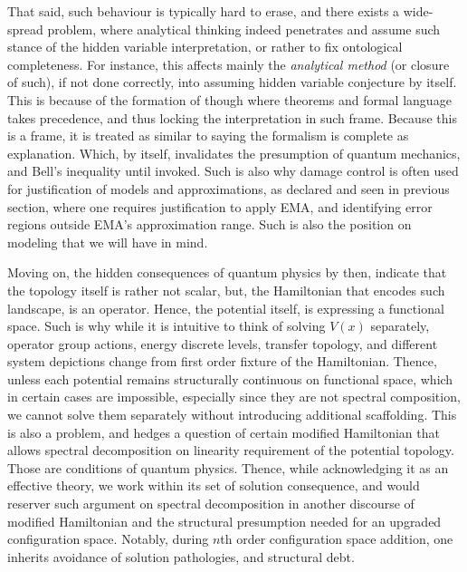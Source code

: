 That said, such behaviour is typically hard to erase, and there exists a wide-spread problem, where analytical thinking indeed penetrates and assume such stance of the hidden variable interpretation, or rather to fix ontological completeness. For instance, this affects mainly the \textit{analytical method} (or closure of such), if not done correctly, into assuming hidden variable conjecture by itself. This is because of the formation of though where theorems and formal language takes precedence, and thus locking the interpretation in such frame. Because this is a frame, it is treated as similar to saying the formalism is complete as explanation. Which, by itself, invalidates the presumption of quantum mechanics, and Bell's inequality until invoked. Such is also why damage control is often used for justification of models and approximations, as declared and seen in previous section, where one requires justification to apply EMA, and identifying error regions outside EMA's approximation range. Such is also the position on modeling that we will have in mind. 

Moving on, the hidden consequences of quantum physics by then, indicate that the topology itself is rather not scalar, but, the Hamiltonian that encodes such landscape, is an operator. Hence, the potential itself, is expressing a functional space. Such is why while it is intuitive to think of solving $V(x)$ separately, operator group actions, energy discrete levels, transfer topology, and different system depictions change from first order fixture of the Hamiltonian. Thence, unless each potential remains structurally continuous on functional space, which in certain cases are impossible, especially since they are not spectral composition, we cannot solve them separately without introducing additional scaffolding. This is also a problem, and hedges a question of certain modified Hamiltonian that allows spectral decomposition on linearity requirement of the potential topology. Those are conditions of quantum physics. Thence, while acknowledging it as an effective theory, we work within its set of solution consequence, and would reserver such argument on spectral decomposition in another discourse of modified Hamiltonian and the structural presumption needed for an upgraded configuration space. Notably, during $n$th order configuration space addition, one inherits avoidance of solution pathologies, and structural debt.


